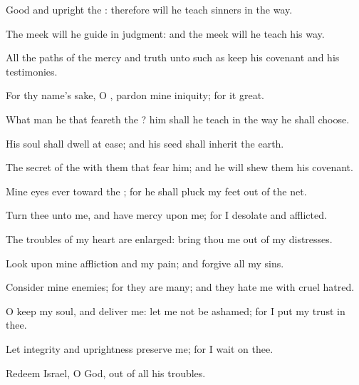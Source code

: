 {\Q {}Good and
upright
{} the
{}: therefore will he
teach
sinners in the
way.


\par }{\Q {}The
meek will he
guide in
judgment: and the
meek will he
teach his
way.


\par }{\Q {}All the
paths of the
{}
{}
mercy and
truth unto such as
keep his
covenant and his
testimonies.


\par }{\Q {}For thy
name’s sake, O
{},
pardon mine
iniquity; for it
{}
great.


\par }{\Q {}What
man
{} he that
feareth the
{}? him shall he
teach in the
way
{} he shall
choose.


\par }{\Q {}His
soul shall
dwell at
ease; and his
seed shall
inherit the
earth.


\par }{\Q {}The
secret of the
{}
{} with them that
fear him; and he will
shew them his
covenant.


\par }{\BB \par }
{\Q {}Mine
eyes
{}
ever toward the
{}; for he shall
pluck my
feet out of the
net.


\par }{\Q {}Turn thee unto me, and have
mercy upon me; for I
{}
desolate and
afflicted.


\par }{\Q {}The
troubles of my
heart are
enlarged:
{} bring thou me
out of my
distresses.


\par }{\Q {}Look upon mine
affliction and my
pain; and
forgive all my
sins.


\par }{\Q {}Consider mine
enemies; for they are
many; and they
hate me with
cruel
hatred.


\par }{\Q {}O
keep my
soul, and
deliver me: let me not be
ashamed; for I put my
trust in thee.


\par }{\Q {}Let
integrity and
uprightness
preserve me; for I
wait on thee.


\par }{\Q {}Redeem
Israel, O
God, out of all his
troubles.




\par }

